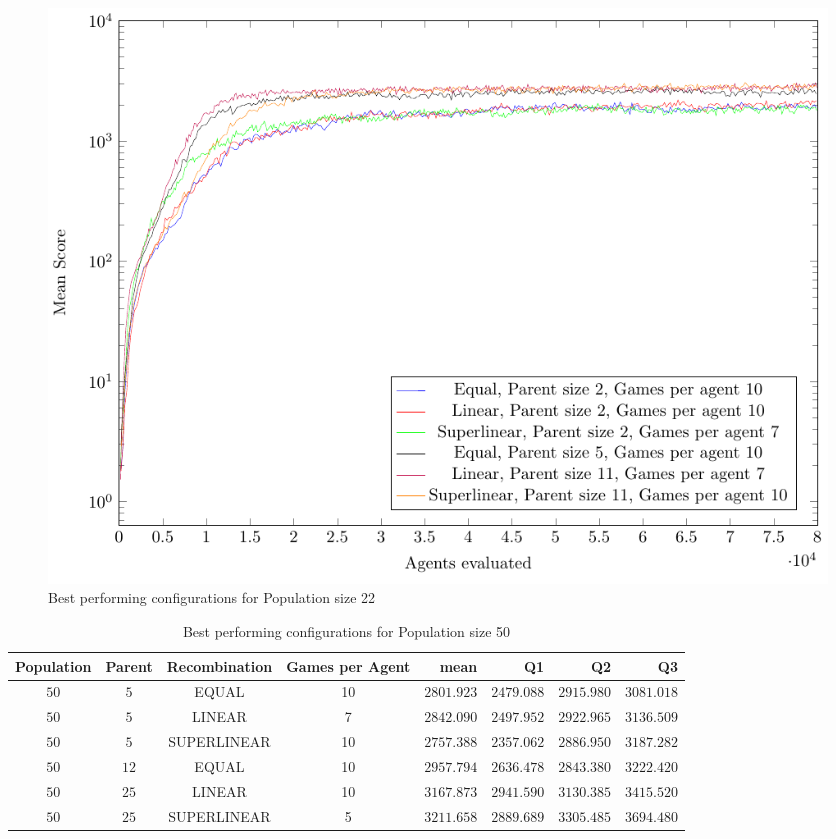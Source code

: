 \begin{figure}[H]
\centering
\includegraphics[scale=1]{data/cma_population_offspring/bestofeach_population/22x/PlotFile.pdf}
\caption{Best performing configurations for Population size 22}
\end{figure}

\clearpage

\begin{table}[H]
\centering
\small
\begin{tabular}{c c c c r r r r}
Population & Parent & Recombination & Games per Agent & mean & Q1 & Q2 & Q3\\
\hline
$50$ & $5$ & EQUAL & 10 & $2801.923$ & $2479.088$ & $2915.980$ & $3081.018$\\
$50$ & $5$ & LINEAR & 7 & $2842.090$ & $2497.952$ & $2922.965$ & $3136.509$\\
$50$ & $5$ & SUPERLINEAR & 10 & $2757.388$ & $2357.062$ & $2886.950$ & $3187.282$\\
$50$ & $12$ & EQUAL & 10 & $2957.794$ & $2636.478$ & $2843.380$ & $3222.420$\\
$50$ & $25$ & LINEAR & 10 & $3167.873$ & $2941.590$ & $3130.385$ & $3415.520$\\
$50$ & $25$ & SUPERLINEAR & 5 & $3211.658$ & $2889.689$ & $3305.485$ & $3694.480$\\
\end{tabular}
\caption{Best performing configurations for Population size 50}
\end{table}


